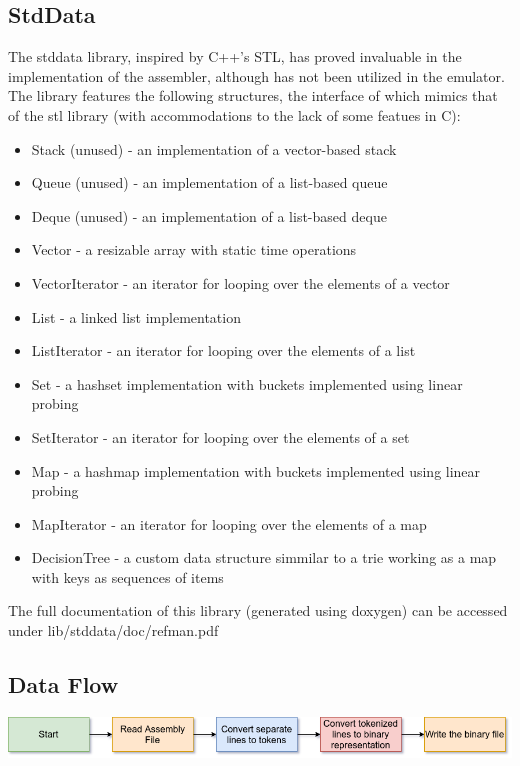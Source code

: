 \documentclass[11pt]{article}
\begin{document}
\subsection*{StdData}
The stddata library, inspired by C++'s STL, has proved invaluable in the implementation of the assembler, although has not been utilized in the emulator. The library features the following structures, the interface of which mimics that of the stl library (with accommodations to the lack of some featues in C):
\begin{itemize}
\item Stack (unused) - an implementation of a vector-based stack
\item Queue (unused) - an implementation of a list-based queue
\item Deque (unused) - an implementation of a list-based deque
\item Vector - a resizable array with static time operations
\item VectorIterator - an iterator for looping over the elements of a vector
\item List - a linked list implementation
\item ListIterator - an iterator for looping over the elements of a list
\item Set - a hashset implementation with buckets implemented using linear probing
\item SetIterator - an iterator for looping over the elements of a set
\item Map - a hashmap implementation with buckets implemented using linear probing
\item MapIterator - an iterator for looping over the elements of a map
\item DecisionTree - a custom data structure simmilar to a trie working as a map with keys as sequences of items
\end{itemize}
The full documentation of this library (generated using doxygen) can be accessed under lib/stddata/doc/refman.pdf
\subsection*{Data Flow}
\includegraphics[scale=0.6]{assembler_dataflow}
\end{document}
